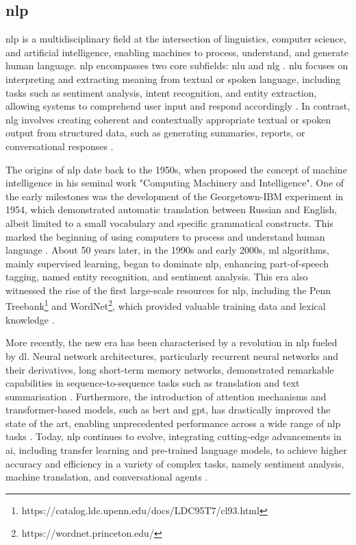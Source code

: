 \subsection{\acl{nlp}} \label{subsec:nlp}

\ac{nlp} is a multidisciplinary field at the intersection of linguistics, computer science, and artificial intelligence, enabling machines to process, understand, and generate human language. \ac{nlp} encompasses two core subfields: \ac{nlu} and \ac{nlg} \cite{Khurana2023}. \ac{nlu} focuses on interpreting and extracting meaning from textual or spoken language, including tasks such as sentiment analysis, intent recognition, and entity extraction, allowing systems to comprehend user input and respond accordingly \cite{Khurana2023}. In contrast, \ac{nlg} involves creating coherent and contextually appropriate textual or spoken output from structured data, such as generating summaries, reports, or conversational responses \cite{Dong2021}.

The origins of \ac{nlp} date back to the 1950s, when  proposed the concept of machine intelligence in his seminal work "Computing Machinery and Intelligence". One of the early milestones was the development of the Georgetown-IBM experiment in 1954, which demonstrated automatic translation between Russian and English, albeit limited to a small vocabulary and specific grammatical constructs. This marked the beginning of using computers to process and understand human language \cite{Hutchins2004}. About 50 years later, in the 1990s and early 2000s, \ac{ml} algorithms, mainly supervised learning, began to dominate \ac{nlp}, enhancing part-of-speech tagging, named entity recognition, and sentiment analysis. This era also witnessed the rise of the first large-scale resources for \ac{nlp}, including the Penn Treebank\footnote{https://catalog.ldc.upenn.edu/docs/LDC95T7/cl93.html} and WordNet\footnote{https://wordnet.princeton.edu/}, which provided valuable training data and lexical knowledge \cite{Marcus1993, Fellbaum1998}.

More recently, the new era has been characterised by a revolution in \ac{nlp} fueled by \ac{dl}. Neural network architectures, particularly recurrent neural networks and their derivatives, long short-term memory networks, demonstrated remarkable capabilities in sequence-to-sequence tasks such as translation and text summarisation \cite{Bahdanau2015}. Furthermore, the introduction of attention mechanisms and transformer-based models, such as \ac{bert} and \ac{gpt}, has drastically improved the state of the art, enabling unprecedented performance across a wide range of \ac{nlp} tasks \cite{Vaswani2017, Devlin2019}. Today, \ac{nlp} continues to evolve, integrating cutting-edge advancements in \ac{ai}, including transfer learning and pre-trained language models, to achieve higher accuracy and efficiency in a variety of complex tasks, namely sentiment analysis, machine translation, and conversational agents \cite{Howard2018}.

